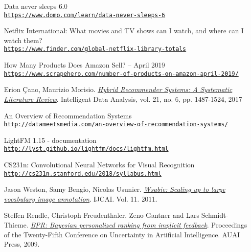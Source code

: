 \begin{thebibliography}{9}

	\hypertarget{domo}{} 
	Data never sleeps 6.0
	\\\texttt{\url{https://www.domo.com/learn/data-never-sleeps-6}}
	
	\hypertarget{finder}{} 
	Netflix International: What movies and TV shows can I watch, and where can I watch them?
	\\\texttt{\url{https://www.finder.com/global-netflix-library-totals}}

	\hypertarget{scrapehero}{} 
	How Many Products Does Amazon Sell? – April 2019
	\\\texttt{\url{https://www.scrapehero.com/number-of-products-on-amazon-april-2019/}}
	
	\hypertarget{ErionCanoMaurizioMorisio}{} 
	Erion Çano, Maurizio Morisio.
	\textit{\href{https://arxiv.org/abs/1901.03888}{Hybrid Recommender Systems: A Systematic Literature Review}}.
	Intelligent Data Analysis, vol. 21, no. 6, pp. 1487-1524, 2017
	
	\hypertarget{datameetsmedia}{} 
	An Overview of Recommendation Systems
	\\\texttt{\url{http://datameetsmedia.com/an-overview-of-recommendation-systems/}}
	
	\hypertarget{lightfm}{} 
	LightFM 1.15 - documentation
	\\\texttt{\url{http://lyst.github.io/lightfm/docs/lightfm.html}}
	
	\hypertarget{cs231n}{} 
	CS231n: Convolutional Neural Networks for Visual Recognition
	\\\texttt{\url{http://cs231n.stanford.edu/2018/syllabus.html}}
	
	\hypertarget{JasonWestonSamyBengioNicolasUsunier}{} 
	Jason Weston, Samy Bengio, Nicolas Usunier.
	\textit{\href{http://www.thespermwhale.com/jaseweston/papers/wsabie-ijcai.pdf}{Wsabie: Scaling up to large vocabulary image annotation}}.
	IJCAI. Vol. 11. 2011.
	
	\hypertarget{SteffenRendleChristophFreudenthalerZenoGantnerLarsSchmidtThieme}{} 
	Steffen Rendle, Christoph Freudenthaler, Zeno Gantner and Lars Schmidt-Thieme.
	\textit{\href{http://www.thespermwhale.com/jaseweston/papers/wsabie-ijcai.pdf}{BPR: Bayesian personalized ranking from implicit feedback}}.
	Proceedings of the Twenty-Fifth Conference on Uncertainty in Artificial Intelligence. AUAI Press, 2009.
	

\end{thebibliography}
